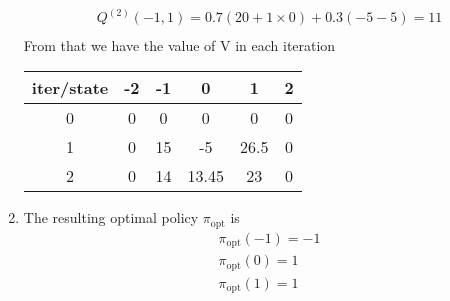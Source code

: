 \documentclass[12pt]{article}
\begin{document}
\begin{enumerate}[label=(\alph*)]
\begin{align*}
    &Q^{(2)}(-1, 1) = 0.7 (20 + 1 \times 0) + 0.3(-5 - 5) = 11 \\
    \end{align*}
    From that we have the value of V in each iteration
    \begin{center}
    \begin{tabular}{ |c|c|c|c|c|c| } 
    \hline
    iter/state & -2 & -1 & 0 & 1 & 2 \\
    \hline
    0 & 0 & 0 & 0 & 0 & 0\\
    \hline
    1 & 0 & 15 & -5 & 26.5 & 0\\
    \hline
    2 & 0 & 14 & 13.45 & 23 & 0\\ 
    \hline
    \end{tabular}
    \end{center}

    \item
    The resulting optimal policy $\pi_{\text{opt}}$ is
    \begin{align*}
        &\pi_{\text{opt}}(-1) = -1 \\
        &\pi_{\text{opt}}(0) = 1 \\
        &\pi_{\text{opt}}(1) = 1 \\
    \end{align*}
\end{enumerate}
\end{document}

